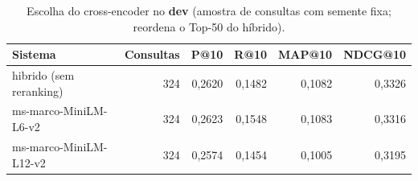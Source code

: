\begin{table}[t]
\centering
\caption{Escolha do cross-encoder no \textbf{dev} (amostra de consultas com semente fixa; reordena o Top-50 do híbrido).}
\label{tab:dev_ce}
\small
\begin{tabular}{lrrrrr}
\toprule
Sistema & Consultas & P@10 & R@10 & MAP@10 & NDCG@10 \\
\midrule
hibrido (sem reranking) & 324 & 0,2620 & 0,1482 & 0,1082 & 0,3326 \\
ms-marco-MiniLM-L6-v2 & 324 & 0,2623 & 0,1548 & 0,1083 & 0,3316 \\
ms-marco-MiniLM-L12-v2 & 324 & 0,2574 & 0,1454 & 0,1005 & 0,3195 \\
\bottomrule
\end{tabular}
\end{table}
